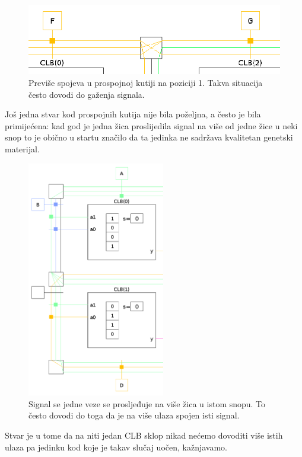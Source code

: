 \documentclass[times, utf8, zavrsni]{fer}
\begin{document}
	
	
	\begin{figure}[H]
		\centering
		\includegraphics[width=18cm]{slike/isjecakPreviseVeza.png}
		\caption{Previše spojeva u prospojnoj kutiji na poziciji 1. Takva situacija često dovodi do gaženja signala. }
		\label{fig:previse-veza}
	\end{figure} 
	
	
	Još jedna stvar kod prospojnih kutija nije bila poželjna, a često je bila primijećena: kad god je jedna žica proslijedila signal na više od jedne žice u neki snop to je obično u startu značilo da ta jedinka ne sadržava kvalitetan genetski materijal.
	
	
	
	\begin{figure}[H]
		\centering
		\includegraphics[width=6cm]{slike/isjecakSusjedneVeze.png}
		\caption{Signal se jedne veze se prosljeđuje na više žica u istom snopu. To često dovodi do toga da je na više ulaza spojen isti signal. }
		\label{fig:susjedne-veze}
	\end{figure} 
	
	
	Stvar je u tome da na niti jedan CLB sklop nikad nećemo dovoditi više istih ulaza pa jedinku kod koje je takav slučaj uočen, kažnjavamo. 
	
\end{document}

